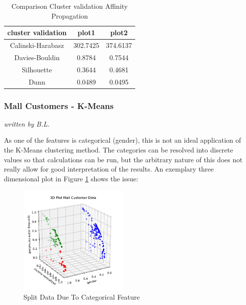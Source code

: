 \begin{table}[H]
	\centering
	\begin{tabular}{||c c c ||} 
		\hline
		cluster validation & plot1 & plot2 \\ [0.5ex] 
		\hline\hline
		Calinski-Harabasz & 302.7425	 &  374.6137  \\ 
		Davies-Bouldin & 0.8784	 & 0.7544	 \\
		Silhouette & 0.3644	 & 0.4681	 \\
		Dunn & 0.0489 & 0.0495  \\ [1ex] 
		\hline
	\end{tabular}
	\caption{Comparison Cluster validation Affinity Propagation}
	
\end{table}

\subsubsection{Mall Customers - K-Means}
\textit{written by B.L.}\\
\label{sec:mall_kmeans_evaluation}

As one of the features is categorical (gender), this is not an ideal application of the K-Means clustering method. The categories can be resolved into discrete values so that calculations can be run, but the arbitrary nature of this does not really allow for good interpretation of the results. An exemplary three dimensional plot in Figure \ref{fig:kmeans_customers_3d} shows the issue: 

\begin{figure}
  \centering
    \includegraphics[width=0.48\textwidth, clip]{images/kmeans_customers_3d.pdf}
  \caption{Split Data Due To {Categorical} Feature}
  \label{fig:kmeans_customers_3d}
\end{figure}

